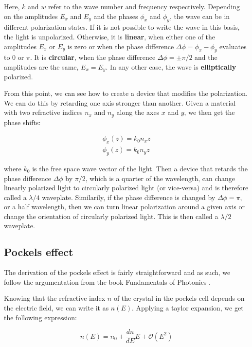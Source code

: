 Here, $k$ and $w$ refer to the wave number and frequency respectively.
Depending on the amplitudes $E_x$ and $E_y$ and the phases $\phi_x$ and $\phi_y$, the wave can be in different polarization states. If it is not possible to write the wave in this basis, the light is unpolarized. Otherwise, it is \textbf{linear}, when either one of the amplitudes $E_x$ or $E_y$ is zero or when the phase difference $\Delta \phi = \phi_x - \phi_y$ evaluates to 0 or $\pi$. It is \textbf{circular}, when the phase difference $\Delta \phi = \pm \pi/2$ and the amplitudes are the same, $E_x = E_y$. In any other case, the wave is \textbf{elliptically} polarized.

From this point, we can see how to create a device that modifies the polarization. We can do this by retarding one axis stronger than another. Given a material with two refractive indices $n_x$ and $n_y$ along the axes $x$ and $y$, we then get the phase shifts:

\begin{align}
	\phi_x(z) = k_0 n_x z \\
	\phi_y(z) = k_0 n_y z
\end{align}
\label{eq:pol,phases}

where $k_0$ is the free space wave vector of the light. Then a device that retards the phase difference $\Delta \phi$ by $\pi/2$, which is a quarter of the wavelength, can change linearly polarized light to circularly polarized light (or vice-versa) and is therefore called a $\lambda / 4$ waveplate. Similarily, if the phase difference is changed by $\Delta \phi = \pi$, or a half wavelength, then we can turn linear polarization around a given axis or change the orientation of circularly polarized light. This is then called a $\lambda / 2$ waveplate.

\subsection{Pockels effect}

The derivation of the pockels effect is fairly straightforward and as such, we follow the argumentation from the book Fundamentals of Photonics .

Knowing that the refractive index $n$ of the crystal in the pockels cell depends on the electric field, we can write it as $n(E)$. Applying a taylor expansion, we get the following expression:

\begin{equation}
	n(E) = n_0 + \frac{dn}{dE} E + \mathcal{O}(E^2)
\end{equation}

